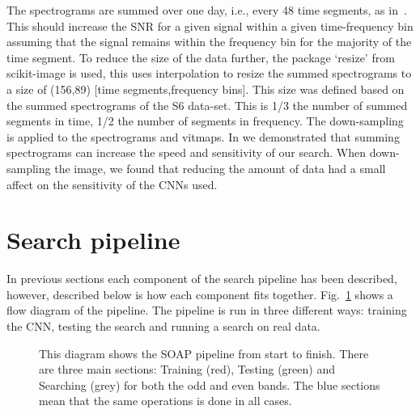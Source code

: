 %
The spectrograms are summed over one day, i.e., every 48 time segments, as
in~\cite{bayley2019SOAPGeneralised}. This should increase the \ac{SNR} for a
given signal within a given time-frequency bin assuming that the
signal remains within the frequency bin for the majority of the time segment.
To reduce the size of the data further, the package `resize' from scikit-image
\cite{vanderwalt2014ScikitimageImage} is used, this uses interpolation to
resize the summed spectrograms to a size of (156,89) [time segments,frequency
bins]. This size was defined based on the summed spectrograms of the S6 data-set. This is 1/3 the number of summed segments in time, 1/2 the number of segments in frequency. The down-sampling is applied to the
spectrograms and vitmaps. 
In \cite{bayley2019SOAPGeneralised} we demonstrated that summing spectrograms can increase the speed and sensitivity of our search.
When down-sampling the image, we found that reducing the amount of data had a small affect on the sensitivity of the \acp{CNN} used.

\section{\label{machine:pipeline}Search pipeline}

In previous sections each component of the search pipeline has been described,
however, described below is how each component fits together. Fig.~\ref{machine:pipeline:flow} shows a flow diagram of the pipeline. The pipeline is run in three different ways: training the \ac{CNN}, testing the search and running a search on real data. 

\begin{figure}[htp]
	\centering
	\scalebox{0.7}{
	}
	\caption{\label{machine:pipeline:flow} This diagram shows the SOAP pipeline from start to finish. There are three main sections: Training (red), Testing (green) and Searching (grey) for both the odd and even bands. The blue sections mean that the same operations is done in all cases.}
	
\end{figure}

